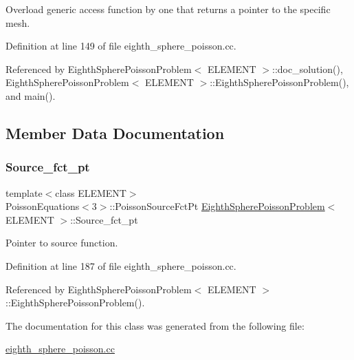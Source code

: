 Overload generic access function by one that returns a pointer to the specific mesh. 



Definition at line 149 of file eighth\+\_\+sphere\+\_\+poisson.\+cc.



Referenced by Eighth\+Sphere\+Poisson\+Problem$<$ E\+L\+E\+M\+E\+N\+T $>$\+::doc\+\_\+solution(), Eighth\+Sphere\+Poisson\+Problem$<$ E\+L\+E\+M\+E\+N\+T $>$\+::\+Eighth\+Sphere\+Poisson\+Problem(), and main().



\subsection{Member Data Documentation}
\mbox{\label{classEighthSpherePoissonProblem_af41ed0ce372d5932c64b3cd4fe69f312}} 
\subsubsection{\texorpdfstring{Source\+\_\+fct\+\_\+pt}{Source\_fct\_pt}}
{\footnotesize\ttfamily template$<$class E\+L\+E\+M\+E\+NT$>$ \\
Poisson\+Equations$<$3$>$\+::Poisson\+Source\+Fct\+Pt \hyperlink{classEighthSpherePoissonProblem}{Eighth\+Sphere\+Poisson\+Problem}$<$ E\+L\+E\+M\+E\+NT $>$\+::Source\+\_\+fct\+\_\+pt\hspace{0.3cm}{\ttfamily [private]}}



Pointer to source function. 



Definition at line 187 of file eighth\+\_\+sphere\+\_\+poisson.\+cc.



Referenced by Eighth\+Sphere\+Poisson\+Problem$<$ E\+L\+E\+M\+E\+N\+T $>$\+::\+Eighth\+Sphere\+Poisson\+Problem().



The documentation for this class was generated from the following file\+:\begin{DoxyCompactItemize}
\item 
\hyperlink{eighth__sphere__poisson_8cc}{eighth\+\_\+sphere\+\_\+poisson.\+cc}\end{DoxyCompactItemize}
